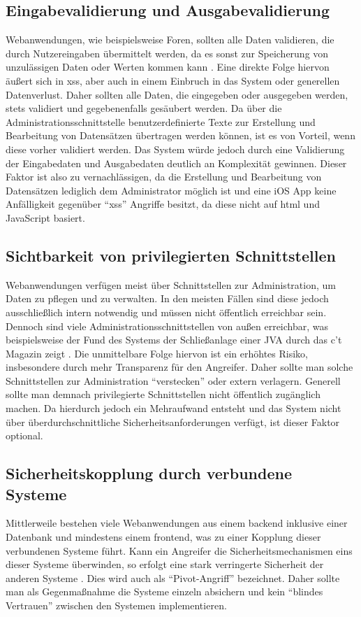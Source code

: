 \subsection{Eingabevalidierung und Ausgabevalidierung}
Webanwendungen, wie beispielsweise Foren, sollten alle Daten validieren, die durch Nutzereingaben übermittelt werden, da es sonst zur Speicherung von unzulässigen Daten oder Werten kommen kann  \cite[S.~58]{websecurity-book}. Eine direkte Folge hiervon äußert sich in \gls{xss}, aber auch in einem Einbruch in das System oder generellen Datenverlust.
Daher sollten alle Daten, die eingegeben oder ausgegeben werden, stets validiert und gegebenenfalls gesäubert werden.
Da über die Administrationsschnittstelle benutzerdefinierte Texte zur Erstellung und Bearbeitung von Datensätzen übertragen werden können, ist es von Vorteil, wenn diese vorher validiert werden. Das System würde jedoch durch eine Validierung der Eingabedaten und Ausgabedaten deutlich an Komplexität gewinnen. Dieser Faktor ist also zu vernachlässigen, da die Erstellung und Bearbeitung von Datensätzen lediglich dem Administrator möglich ist und eine iOS App keine Anfälligkeit gegenüber \enquote{xss} Angriffe besitzt, da diese nicht auf \gls{html} und JavaScript basiert.

\subsection{Sichtbarkeit von privilegierten Schnittstellen}
Webanwendungen verfügen meist über Schnittstellen zur Administration, um Daten zu pflegen und zu verwalten.
In den meisten Fällen sind diese jedoch ausschließlich intern notwendig und müssen nicht öffentlich erreichbar sein.
Dennoch sind viele Administrationsschnittstellen von außen erreichbar, was beispielsweise der Fund des Systems der Schließanlage einer JVA durch das c’t Magazin zeigt \cite[S.~78]{ct}.
Die unmittelbare Folge hiervon ist ein erhöhtes Risiko, insbesondere durch mehr Transparenz für den Angreifer.
Daher sollte man solche Schnittstellen zur Administration \enquote{verstecken} oder extern verlagern.
Generell sollte man demnach privilegierte Schnittstellen nicht öffentlich zugänglich machen. Da hierdurch jedoch ein Mehraufwand entsteht und das System nicht über überdurchschnittliche Sicherheitsanforderungen verfügt, ist dieser Faktor optional.

\subsection{Sicherheitskopplung durch verbundene Systeme}
Mittlerweile bestehen viele Webanwendungen aus einem \gls{backend} inklusive einer Datenbank und mindestens einem \gls{frontend}, was zu einer Kopplung dieser verbundenen Systeme führt. Kann ein Angreifer die Sicherheitsmechanismen eins dieser Systeme überwinden, so erfolgt eine stark verringerte Sicherheit der anderen Systeme  \cite[S.~20]{websecurity-book}. Dies wird auch als \enquote{Pivot-Angriff} bezeichnet.
Daher sollte man als Gegenmaßnahme die Systeme einzeln absichern und kein \enquote{blindes Vertrauen} zwischen den Systemen implementieren.

